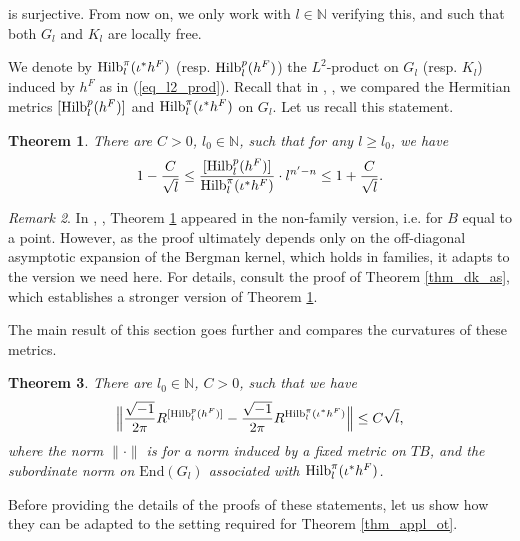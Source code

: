 \documentclass[12pt]{article}
\numberwithin{equation}{section}
\theoremstyle{theorem}
\newtheorem{thm}{Theorem}[section]
\theoremstyle{definition}
\theoremstyle{remark}
\newtheorem{rem}[thm]{Remark}
\newcommand{\imun} {\sqrt{-1}}
\newcommand{\nat}{\mathbb{N}}
\newcommand{\enmr}[1]{\text{End}{(#1)}}
\begin{document}
	is surjective.
	From now on, we only work with $l \in \nat$ verifying this, and such that both $G_l$ and $K_l$ are locally free.
	\par 
	We denote by ${\rm{Hilb}}_l^{\pi}(\iota^* h^F)$ (resp. ${\rm{Hilb}}_l^p(h^F)$) the $L^2$-product on $G_l$ (resp. $K_l$) induced by $h^F$ as in (\ref{eq_l2_prod}).
	Recall that in \cite{FinToeplImm}, \cite{FinOTRed}, we compared the Hermitian metrics $[{\rm{Hilb}}_l^p(h^F)]$ and ${\rm{Hilb}}_l^{\pi}(\iota^* h^F)$ on $G_l$.
	Let us recall this statement.
	\begin{thm}\label{thm_appl_ot2a}
		There are $C > 0$, $l_0 \in \nat$, such that for any $l \geq l_0$, we have
		\begin{equation}
			1 - \frac{C}{\sqrt{l}}
			\leq
			\frac{[{\rm{Hilb}}_l^p(h^F)]}{{\rm{Hilb}}_l^{\pi}(\iota^* h^F)} \cdot l^{n' - n}
			\leq
			1 + \frac{C}{\sqrt{l}}.
		\end{equation}
	\end{thm}
	\begin{rem}
		In \cite{FinToeplImm}, \cite{FinOTRed}, Theorem \ref{thm_appl_ot2a} appeared in the non-family version, i.e. for $B$ equal to a point.
		However, as the proof ultimately depends only on the off-diagonal asymptotic expansion of the Bergman kernel, which holds in families, it adapts to the version we need here.
		For details, consult the proof of Theorem \ref{thm_dk_as}, which establishes a stronger version of Theorem \ref{thm_appl_ot2a}.
	\end{rem}
	The main result of this section goes further and compares the curvatures of these metrics.
	\begin{thm}\label{cor_quot_nm}
		There are $l_0 \in \nat$, $C > 0$, such that we have
		\begin{equation}\label{eq_appl_ot2}
		\Big\|  
			\frac{\imun}{2 \pi} R^{[{\rm{Hilb}}_l^p(h^F)]} - \frac{\imun}{2 \pi} R^{{\rm{Hilb}}_l^{\pi}(\iota^* h^F)}
		\Big\| \leq C \sqrt{l},
		\end{equation}
		where the norm $\| \cdot \|$ is for a norm induced by a fixed metric on $TB$, and the subordinate norm on $\enmr{G_l}$ associated with ${\rm{Hilb}}_l^{\pi}(\iota^* h^F)$.
	\end{thm}
	Before providing the details of the proofs of these statements, let us show how they can be adapted to the setting required for Theorem \ref{thm_appl_ot}.
\end{document}
